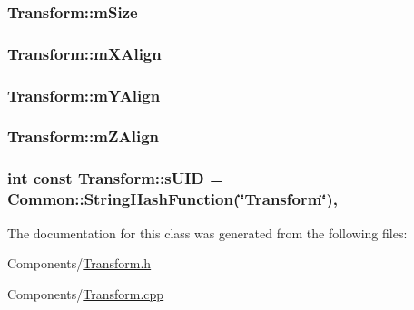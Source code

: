 \subsubsection[{\texorpdfstring{m\+Size}{mSize}}]{ Transform\+::m\+Size\hspace{0.3cm}{\ttfamily [private]}}\hypertarget{classTransform_ad52265c4e89c167205c72dcd7cd5d696}{}\label{classTransform_ad52265c4e89c167205c72dcd7cd5d696}
\subsubsection[{\texorpdfstring{m\+X\+Align}{mXAlign}}]{ Transform\+::m\+X\+Align\hspace{0.3cm}{\ttfamily [private]}}\hypertarget{classTransform_a28f4dc98598dd8f150b26a7542c25c33}{}\label{classTransform_a28f4dc98598dd8f150b26a7542c25c33}
\subsubsection[{\texorpdfstring{m\+Y\+Align}{mYAlign}}]{ Transform\+::m\+Y\+Align\hspace{0.3cm}{\ttfamily [private]}}\hypertarget{classTransform_a72a2c6c9b517604089a3d8f23ccde296}{}\label{classTransform_a72a2c6c9b517604089a3d8f23ccde296}
\subsubsection[{\texorpdfstring{m\+Z\+Align}{mZAlign}}]{ Transform\+::m\+Z\+Align\hspace{0.3cm}{\ttfamily [private]}}\hypertarget{classTransform_a758b797e43f61a2c01820782ff1705f0}{}\label{classTransform_a758b797e43f61a2c01820782ff1705f0}
\subsubsection[{\texorpdfstring{s\+U\+ID}{sUID}}]{\setlength{\rightskip}{0pt plus 5cm}int const Transform\+::s\+U\+ID = {\bf Common\+::\+String\+Hash\+Function}(\char`\"{}Transform\char`\"{})\hspace{0.3cm}{\ttfamily [static]}, {\ttfamily [private]}}\hypertarget{classTransform_aa46d87cf37253c77a12a722501c7077c}{}\label{classTransform_aa46d87cf37253c77a12a722501c7077c}


The documentation for this class was generated from the following files\+:\begin{DoxyCompactItemize}
\item 
Components/\hyperlink{Transform_8h}{Transform.\+h}\item 
Components/\hyperlink{Transform_8cpp}{Transform.\+cpp}\end{DoxyCompactItemize}
